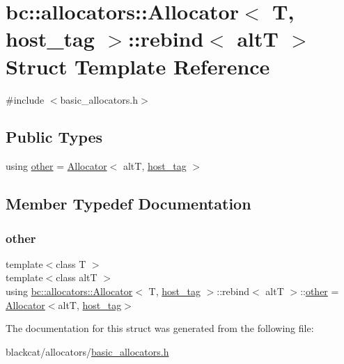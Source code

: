 \hypertarget{structbc_1_1allocators_1_1Allocator_3_01T_00_01host__tag_01_4_1_1rebind}{}\section{bc\+:\+:allocators\+:\+:Allocator$<$ T, host\+\_\+tag $>$\+:\+:rebind$<$ altT $>$ Struct Template Reference}
\label{structbc_1_1allocators_1_1Allocator_3_01T_00_01host__tag_01_4_1_1rebind}


{\ttfamily \#include $<$basic\+\_\+allocators.\+h$>$}

\subsection*{Public Types}
\begin{DoxyCompactItemize}
\item 
using \hyperlink{structbc_1_1allocators_1_1Allocator_3_01T_00_01host__tag_01_4_1_1rebind_ada960dac7d53298859549a32391bd46a}{other} = \hyperlink{classbc_1_1allocators_1_1Allocator}{Allocator}$<$ altT, \hyperlink{structbc_1_1host__tag}{host\+\_\+tag} $>$
\end{DoxyCompactItemize}


\subsection{Member Typedef Documentation}
\mbox{\label{structbc_1_1allocators_1_1Allocator_3_01T_00_01host__tag_01_4_1_1rebind_ada960dac7d53298859549a32391bd46a}} 
\subsubsection{\texorpdfstring{other}{other}}
{\footnotesize\ttfamily template$<$class T $>$ \\
template$<$class altT $>$ \\
using \hyperlink{classbc_1_1allocators_1_1Allocator}{bc\+::allocators\+::\+Allocator}$<$ T, \hyperlink{structbc_1_1host__tag}{host\+\_\+tag} $>$\+::rebind$<$ altT $>$\+::\hyperlink{structbc_1_1allocators_1_1Allocator_3_01T_00_01host__tag_01_4_1_1rebind_ada960dac7d53298859549a32391bd46a}{other} =  \hyperlink{classbc_1_1allocators_1_1Allocator}{Allocator}$<$altT, \hyperlink{structbc_1_1host__tag}{host\+\_\+tag}$>$}



The documentation for this struct was generated from the following file\+:\begin{DoxyCompactItemize}
\item 
blackcat/allocators/\hyperlink{basic__allocators_8h}{basic\+\_\+allocators.\+h}\end{DoxyCompactItemize}
